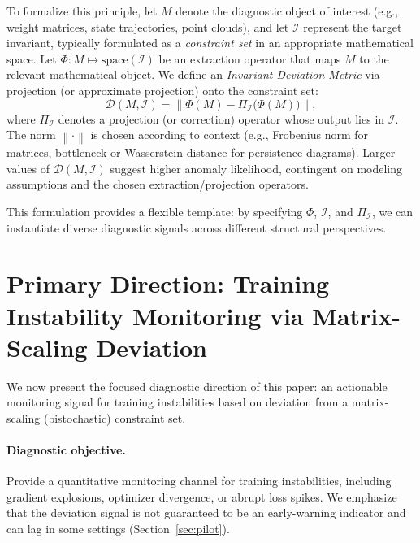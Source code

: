 \documentclass[11pt]{article}
\newcommand{\norm}[1]{\left\lVert #1 \right\rVert}
\begin{document}
To formalize this principle, let $M$ denote the diagnostic object of interest (e.g., weight matrices, state trajectories, point clouds), and let $\mathcal{I}$ represent the target invariant, typically formulated as a \emph{constraint set} in an appropriate mathematical space. Let $\Phi: M \mapsto \text{space}(\mathcal{I})$ be an extraction operator that maps $M$ to the relevant mathematical object. We define an \emph{Invariant Deviation Metric} via projection (or approximate projection) onto the constraint set:
\begin{equation}
\mathcal{D}(M,\mathcal{I})
= \norm{ \Phi(M) - \Pi_{\mathcal{I}}\!\big(\Phi(M)\big) },
\end{equation}
where $\Pi_{\mathcal{I}}$ denotes a projection (or correction) operator whose output lies in $\mathcal{I}$. The norm $\norm{\cdot}$ is chosen according to context (e.g., Frobenius norm for matrices, bottleneck or Wasserstein distance for persistence diagrams). Larger values of $\mathcal{D}(M,\mathcal{I})$ suggest higher anomaly likelihood, contingent on modeling assumptions and the chosen extraction/projection operators.

This formulation provides a flexible template: by specifying $\Phi$, $\mathcal{I}$, and $\Pi_{\mathcal{I}}$, we can instantiate diverse diagnostic signals across different structural perspectives.
\section{Primary Direction: Training Instability Monitoring via Matrix-Scaling Deviation}
\label{sec:training-warning}

We now present the focused diagnostic direction of this paper: an actionable monitoring signal for training instabilities based on deviation from a matrix-scaling (bistochastic) constraint set.

\paragraph{Diagnostic objective.}
Provide a quantitative monitoring channel for training instabilities, including gradient explosions, optimizer divergence, or abrupt loss spikes. We emphasize that the deviation signal is not guaranteed to be an early-warning indicator and can lag in some settings (Section~\ref{sec:pilot}).
\end{document}
